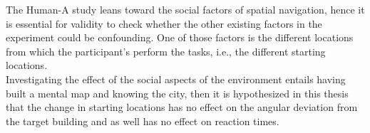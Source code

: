 The Human-A study leans toward the social factors of spatial navigation, hence it is essential for validity to check whether the other existing factors in the experiment could be confounding. One of those factors is the different locations from which the participant's perform the tasks, i.e., the different starting locations. \\

Investigating the effect of the social aspects of the environment entails having built a mental map and knowing the city, then it is hypothesized in this thesis that the change in starting locations has no effect on the angular deviation from the target building and as well has no effect on reaction times.
